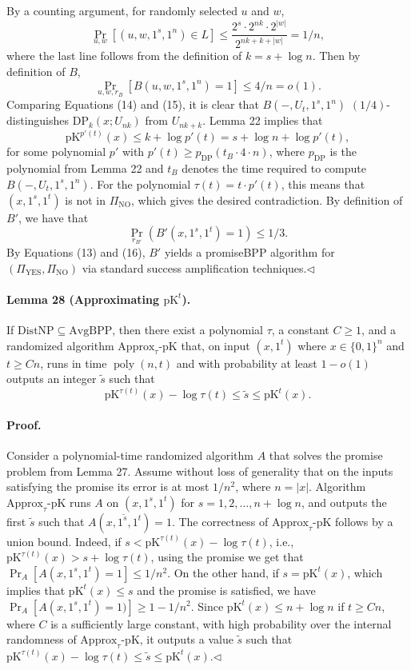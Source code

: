 \documentclass[10pt,a4paper]{article}
\begin{document}
By a counting argument, for randomly selected $u$ and $w$,
\[\Pr_{u,w}[(u,w,1^s,1^n)\in L]\leq\frac{2^s\cdot2^{nk}\cdot2^{|w|}}{2^{nk+k+|w|}}=1/n,\]
where the last line follows from the definition of $k=s+\log n$. Then by definition of $B$,
\[\Pr_{u,w,r_B}[B(u,w,1^s,1^n)=1]\leq4/n=o(1).\tag{15}\]
Comparing Equations (14) and (15), it is clear that $B(-,U_t,1^s,1^n)$ $(1/4)$-distinguishes $\mathrm{DP}_k(x;U_{nk})$ from $U_{nk+k}$. Lemma 22 implies that
\[\mathrm{pK}^{p'(t)}(x)\leq k+\log p'(t)=s+\log n+\log p'(t),\]
for some polynomial $p'$ with $p'(t)\geq p_{\mathrm{DP}}(t_B\cdot4\cdot n)$, where $p_{\mathrm{DP}}$ is the polynomial from Lemma 22 and $t_B$ denotes the time required to compute $B(-,U_t,1^s,1^n)$. For the polynomial $\tau(t)=t\cdot p'(t)$, this means that $(x,1^s,1^t)$ is not in $\Pi_{\mathrm{NO}}$, which gives the desired contradiction. By definition of $B'$, we have that
\[\Pr_{r_{B'}}(B'(x,1^s,1^t)=1)\leq1/3.\tag{16}\]
By Equations (13) and (16), $B'$ yields a promiseBPP algorithm for $(\Pi_{\mathrm{YES}},\Pi_{\mathrm{NO}})$ via standard success amplification techniques.\hfill$\triangleleft$
\paragraph{Lemma 28 (Approximating $\mathrm{pK}^t$).} If $\mathrm{DistNP}\subseteq\mathrm{AvgBPP}$, then there exist a polynomial $\tau$, a constant $C\geq1$, and a randomized algorithm $\mathrm{Approx}_{\tau}\text{-}\mathrm{pK}$ that, on input $(x,1^t)$ where $x\in\{0,1\}^n$ and $t\geq Cn$, runs in time $\operatorname{poly}(n,t)$ and with probability at least $1-o(1)$ outputs an integer $\widetilde s$ such that
\[\mathrm{pK}^{\tau(t)}(x)-\log\tau(t)\leq\widetilde s\leq\mathrm{pK}^t(x).\]
\paragraph{Proof.} Consider a polynomial-time randomized algorithm $A$ that solves the promise problem from Lemma 27. Assume without loss of generality that on the inputs satisfying the promise its error is at most $1/n^2$, where $n=|x|$. Algorithm $\mathrm{Approx}_\tau\text{-}\mathrm{pK}$ runs $A$ on $(x,1^s,1^t)$ for $s=1,2,\ldots,n+\log n$, and outputs the first $\widetilde s$ such that $A(x,1^{\widetilde s},1^t)=1$.
The correctness of $\mathrm{Approx}_\tau\text{-}\mathrm{pK}$ follows by a union bound. Indeed, if $s<\mathrm{pK}^{\tau(t)}(x)-\log\tau(t)$, i.e., $\mathrm{pK}^{\tau(t)}(x)>s+\log\tau(t)$, using the promise we get that $\Pr_A[A(x,1^s,1^t)=1]\leq1/n^2$. On the other hand, if $s=\mathrm{pK}^t(x)$, which implies that $\mathrm{pK}^t(x)\leq s$ and the promise is satisfied, we have $\Pr_A[A(x,1^s,1^t)=1)]\geq1-1/n^2$. Since $\mathrm{pK}^t(x)\leq n+\log n$ if $t\geq Cn$, where $C$ is a sufficiently large constant, with high probability over the internal randomness of $\mathrm{Approx}_\tau\text{-}\mathrm{pK}$, it outputs a value $\widetilde s$ such that $\mathrm{pK}^{\tau(t)}(x)-\log\tau(t)\leq\widetilde s\leq\mathrm{pK}^t(x)$.\hfill$\triangleleft$
\end{document}
